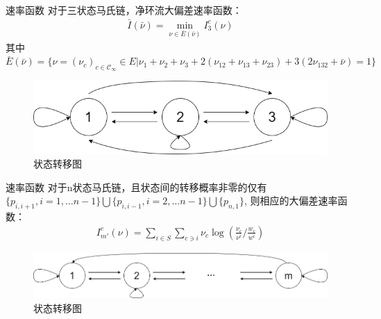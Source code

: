 \documentclass{beamer}
\begin{document}
	\begin{frame}{速率函数}
		对于三状态马氏链，净环流大偏差速率函数：
		\begin{align*}
			\bar{I}(\bar{\nu}) = \min_{\nu \in \bar{E}(\bar{\nu})} I^c_3(\nu)
		\end{align*}
		其中 $\bar{E}(\bar{\nu}) = \{\nu = (\nu_c)_{c \in \mathcal{C}_{\infty}} \in E | \nu_1 +\nu_2 +\nu_3 +2(\nu_{12} +\nu_{13} +\nu_{23}) +3(2\nu_{132} +\bar{\nu})=1\}$

		\begin{figure}[h]
			\centering
			\includegraphics[scale=0.3]{chart/3-state.png}
			\caption*{状态转移图}
		\end{figure}
	\end{frame}

	\begin{frame}{速率函数}
		对于n状态马氏链，且状态间的转移概率非零的仅有$\{p_{i, i+1}, i=1, \dots n-1\} \bigcup \{p_{i, i-1}, i=2, \dots n-1\} \bigcup \{p_{n,1}\}$, 则相应的大偏差速率函数：
		\begin{align*}
			I_{m'}^{c}(\nu) = \sum_{i \in S} \sum_{c \ni i} \nu_c \log \left(\frac{\nu_c}{\nu^i} /\frac{w_c}{w^i}\right)
		\end{align*}
		\begin{figure}[h]
			\centering
			\includegraphics[scale=0.3]{chart/n-state.png}
			\caption*{状态转移图}
		\end{figure}
	\end{frame}
\end{document}
